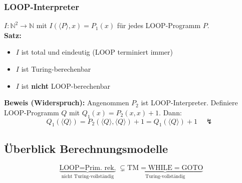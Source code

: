 \subsubsection{LOOP-Interpreter}
$I : \mathbb{N}^2 \to \mathbb{N}$ mit $I(\langle P \rangle, x) = P_1(x)$ für jedes LOOP-Programm $P$.\\
\textbf{Satz:}
\begin{itemize}
    \item $I$ ist total und eindeutig (LOOP terminiert immer)
    \item $I$ ist Turing-berechenbar
    \item $I$ ist \textbf{nicht} LOOP-berechenbar
\end{itemize}
\textbf{Beweis (Widerspruch):} Angenommen $P_2$ ist LOOP-Interpreter. Definiere LOOP-Programm $Q$ mit $Q_1(x) = P_2(x,x) + 1$. Dann:
\[
    Q_1(\langle Q \rangle) = P_2(\langle Q \rangle, \langle Q \rangle) + 1 = Q_1(\langle Q \rangle) + 1 \quad \lightning
\]

\subsection{Überblick Berechnungsmodelle}
\[
    \underbrace{\text{LOOP} = \text{Prim.\ rek.}}_{\text{nicht Turing-vollständig}} \subsetneq \underbrace{\text{TM} = \text{WHILE} = \text{GOTO}}_{\text{Turing-vollständig}}
\]
